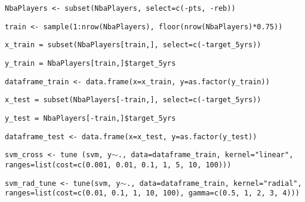 \begin{center}
\texttt{NbaPlayers <- subset(NbaPlayers, select=c(-pts, -reb))}

\texttt{train <- sample(1:nrow(NbaPlayers), floor(nrow(NbaPlayers)*0.75))}

\texttt{x\_train = subset(NbaPlayers[train,], select=c(-target\_5yrs))}

\texttt{y\_train = NbaPlayers[train,]\$target\_5yrs}

\texttt{dataframe\_train <- data.frame(x=x\_train, y=as.factor(y\_train))}

\texttt{x\_test = subset(NbaPlayers[-train,], select=c(-target\_5yrs))}

\texttt{y\_test = NbaPlayers[-train,]\$target\_5yrs}

\texttt{dataframe\_test <- data.frame(x=x\_test, y=as.factor(y\_test))}

\texttt{svm\_cross <- tune (svm, y$\sim$., data=dataframe\_train, kernel="linear", ranges=list(cost=c(0.001, 0.01, 0.1, 1, 5, 10, 100)))}

\texttt{svm\_rad\_tune <- tune(svm, y$\sim$., data=dataframe\_train, kernel="radial", ranges=list(cost=c(0.01, 0.1, 1, 10, 100), gamma=c(0.5, 1, 2, 3, 4)))}


\end{center}